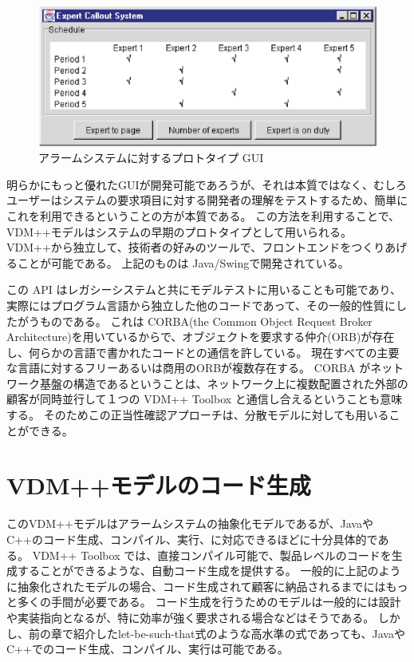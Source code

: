\documentclass[\pformat,12pt,twoside]{jarticle}
\begin{document}
\begin{figure}[htbp]
\begin{center}
\includegraphics[width=4.999in]{javagui}
\caption{アラームシステムに対するプロトタイプ GUI \label{fig:javagui}}
\end{center}
\end{figure}

明らかにもっと優れたGUIが開発可能であろうが、それは本質ではなく、むしろユーザーはシステムの要求項目に対する開発者の理解をテストするため、簡単にこれを利用できるということの方が本質である。
この方法を利用することで、VDM++モデルはシステムの早期のプロトタイプとして用いられる。
VDM++から独立して、技術者の好みのツールで、フロントエンドをつくりあげることが可能である。
上記のものは Java/Swingで開発されている。

この API はレガシーシステムと共にモデルテストに用いることも可能であり、実際にはプログラム言語から独立した他のコードであって、その一般的性質にしたがうものである。
これは CORBA(the Common Object Request Broker Architecture)を用いているからで、オブジェクトを要求する仲介(ORB)が存在し、何らかの言語で書かれたコードとの通信を許している。
現在すべての主要な言語に対するフリーあるいは商用のORBが複数存在する。
 CORBA がネットワーク基盤の構造であるということは、ネットワーク上に複数配置された外部の顧客が同時並行して１つの VDM++ Toolbox と通信し合えるということも意味する。
そのためこの正当性確認アプローチは、分散モデルに対しても用いることができる。

\section{VDM++モデルのコード生成}

このVDM++モデルはアラームシステムの抽象化モデルであるが、JavaやC++のコード生成、コンパイル、実行、に対応できるほどに十分具体的である。
 VDM++ Toolbox では、直接コンパイル可能で、製品レベルのコードを生成することができるような、自動コード生成を提供する。
一般的に上記のように抽象化されたモデルの場合、コード生成されて顧客に納品されるまでにはもっと多くの手間が必要である。
コード生成を行うためのモデルは一般的には設計や実装指向となるが、特に効率が強く要求される場合などはそうである。
しかし、前の章で紹介したlet-be-such-that式のような高水準の式であっても、JavaやC++でのコード生成、コンパイル、実行は可能である。
\end{document}

